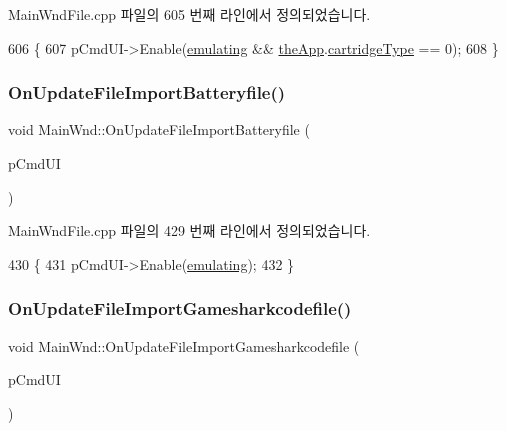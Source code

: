 Main\+Wnd\+File.\+cpp 파일의 605 번째 라인에서 정의되었습니다.


\begin{DoxyCode}
606 \{
607   pCmdUI->Enable(\mbox{\hyperlink{_main_wnd_file_8cpp_af9cc36078b1b311753963297ae7f2a74}{emulating}} && \mbox{\hyperlink{_v_b_a_8cpp_a8095a9d06b37a7efe3723f3218ad8fb3}{theApp}}.\mbox{\hyperlink{class_v_b_a_af300759fcbc7eeb00ce73f956fc5ddb7}{cartridgeType}} == 0);  
608 \}
\end{DoxyCode}
\mbox{\label{class_main_wnd_a8495cabf7c5e45a773160b17a0555da7}} 
\subsubsection{\texorpdfstring{On\+Update\+File\+Import\+Batteryfile()}{OnUpdateFileImportBatteryfile()}}
{\footnotesize\ttfamily void Main\+Wnd\+::\+On\+Update\+File\+Import\+Batteryfile (\begin{DoxyParamCaption}\item[{C\+Cmd\+UI $\ast$}]{p\+Cmd\+UI }\end{DoxyParamCaption})\hspace{0.3cm}{\ttfamily [protected]}}



Main\+Wnd\+File.\+cpp 파일의 429 번째 라인에서 정의되었습니다.


\begin{DoxyCode}
430 \{
431   pCmdUI->Enable(\mbox{\hyperlink{_main_wnd_file_8cpp_af9cc36078b1b311753963297ae7f2a74}{emulating}});  
432 \}
\end{DoxyCode}
\mbox{\label{class_main_wnd_aec0517b8da64f0752ce975f0ac84d8a1}} 
\subsubsection{\texorpdfstring{On\+Update\+File\+Import\+Gamesharkcodefile()}{OnUpdateFileImportGamesharkcodefile()}}
{\footnotesize\ttfamily void Main\+Wnd\+::\+On\+Update\+File\+Import\+Gamesharkcodefile (\begin{DoxyParamCaption}\item[{C\+Cmd\+UI $\ast$}]{p\+Cmd\+UI }\end{DoxyParamCaption})\hspace{0.3cm}{\ttfamily [protected]}}




